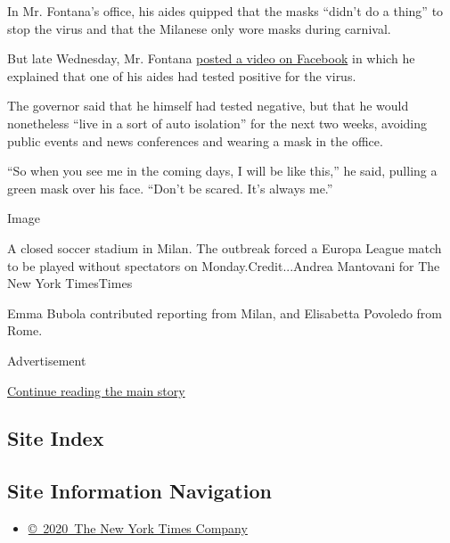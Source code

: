 In Mr. Fontana's office, his aides quipped that the masks ``didn't do a
thing'' to stop the virus and that the Milanese only wore masks during
carnival.

But late Wednesday, Mr. Fontana
\href{https://www.facebookcorewwwi.onion/fontanaufficiale/videos/191575302125882/}{posted
a video on Facebook} in which he explained that one of his aides had
tested positive for the virus.

The governor said that he himself had tested negative, but that he would
nonetheless ``live in a sort of auto isolation'' for the next two weeks,
avoiding public events and news conferences and wearing a mask in the
office.

``So when you see me in the coming days, I will be like this,'' he said,
pulling a green mask over his face. ``Don't be scared. It's always me.''

Image

A closed soccer stadium in Milan. The outbreak forced a Europa League
match to be played without spectators on Monday.Credit...Andrea
Mantovani for The New York TimesTimes

Emma Bubola contributed reporting from Milan, and Elisabetta Povoledo
from Rome.

Advertisement

\protect\hyperlink{after-bottom}{Continue reading the main story}

\hypertarget{site-index}{%
\subsection{Site Index}\label{site-index}}

\hypertarget{site-information-navigation}{%
\subsection{Site Information
Navigation}\label{site-information-navigation}}

\begin{itemize}
\tightlist
\item
  \href{https://help.nytimes3xbfgragh.onion/hc/en-us/articles/115014792127-Copyright-notice}{©~2020~The
  New York Times Company}
\end{itemize}

